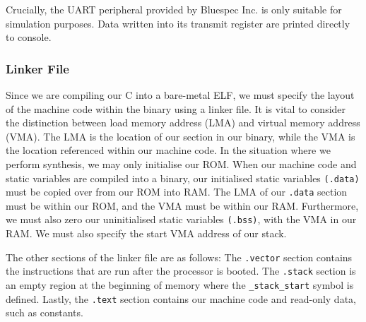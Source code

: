 \documentclass[a4paper,8pt]{report}
\begin{document}
Crucially, the UART peripheral provided by Bluespec Inc. is only suitable for
simulation purposes. Data written into its transmit register are printed
directly to console. 

\subsubsection{Linker File}
Since we are compiling our C into a bare-metal ELF, we must specify the layout
of the machine code within the binary using a linker file.
It is vital to consider the distinction between load memory address (LMA) and
virtual memory address (VMA). The LMA is the location of our section in our
binary, while the VMA is the location
referenced within our machine code. In the situation where we perform synthesis,
we may only initialise our ROM. When our machine code and static variables are
compiled into a binary, our initialised static variables \texttt{(.data)} must
be copied over from our ROM into RAM. The LMA of our \texttt{.data} section must
be within our ROM, and the VMA must be within our RAM. Furthermore, we must also
zero our uninitialised static variables \texttt{(.bss)}, with the VMA in our
RAM. We must also specify the start VMA address of our stack.

The other sections of the linker file are as follows: The \texttt{.vector}
section contains the instructions that are run after the processor is booted.
The \texttt{.stack} section is an empty region at the beginning of memory
where the \texttt{\_stack\_start} symbol is defined. Lastly, the \texttt{.text}
section contains our machine code and read-only data, such as constants.
\end{document}
